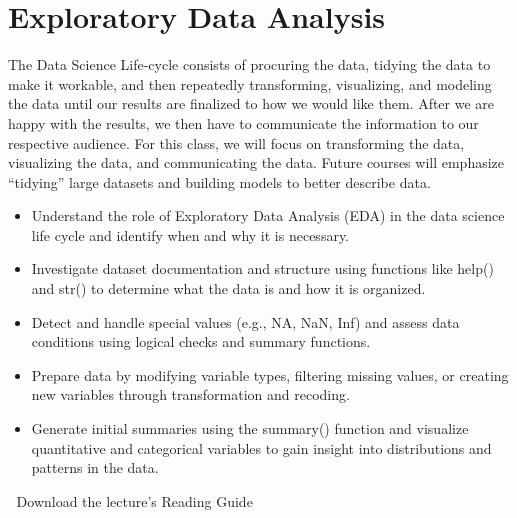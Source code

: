\documentclass[
  letterpaper,
  DIV=11,
  numbers=noendperiod]{scrreprt}
\providecommand{\tightlist}{%
  \setlength{\itemsep}{0pt}\setlength{\parskip}{0pt}}
\begin{document}
\chapter{Exploratory Data Analysis}\label{exploratory-data-analysis}

The Data Science Life-cycle consists of procuring the data, tidying the
data to make it workable, and then repeatedly transforming, visualizing,
and modeling the data until our results are finalized to how we would
like them. After we are happy with the results, we then have to
communicate the information to our respective audience. For this class,
we will focus on transforming the data, visualizing the data, and
communicating the data. Future courses will emphasize ``tidying'' large
datasets and building models to better describe data.

\begin{itemize}
\tightlist
\item
  Understand the role of Exploratory Data Analysis (EDA) in the data
  science life cycle and identify when and why it is necessary.
\item
  Investigate dataset documentation and structure using functions like
  help() and str() to determine what the data is and how it is
  organized.
\item
  Detect and handle special values (e.g., NA, NaN, Inf) and assess data
  conditions using logical checks and summary functions.
\item
  Prepare data by modifying variable types, filtering missing values, or
  creating new variables through transformation and recoding.
\item
  Generate initial summaries using the summary() function and visualize
  quantitative and categorical variables to gain insight into
  distributions and patterns in the data.
\end{itemize}

\begin{tcolorbox}[enhanced jigsaw, leftrule=.75mm, arc=.35mm, coltitle=black, rightrule=.15mm, bottomrule=.15mm, toprule=.15mm, left=2mm, colbacktitle=quarto-callout-tip-color!10!white, title=\textcolor{quarto-callout-tip-color}{\faLightbulb}\hspace{0.5em}{Supplemental Material}, toptitle=1mm, breakable, colframe=quarto-callout-tip-color-frame, bottomtitle=1mm, titlerule=0mm, colback=white, opacityback=0, opacitybacktitle=0.6]

📄 Download the lecture's Reading Guide

\end{tcolorbox}
\end{document}

